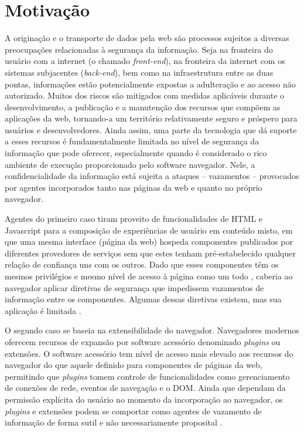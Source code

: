\section{Motivação}


A originação e o transporte de dados pela web são processos sujeitos a diversas preocupações relacionadas à segurança da informação. Seja na fronteira do usuário com a internet (o chamado \textit{front-end}), na fronteira da internet com os sistemas subjacentes (\textit{back-end}), bem como na infraestrutura entre as duas pontas, informações estão potencialmente expostas a adulteração e ao acesso não autorizado. Muitos dos riscos são mitigados com medidas aplicáveis durante o desenvolvimento, a publicação e a manutenção dos recursos que compõem as aplicações da web, tornando-a um território relativamente seguro e próspero para usuários e desenvolvedores. Ainda assim, uma parte da tecnologia que dá suporte a esses recursos é fundamentalmente limitada no nível de segurança da informação que pode oferecer, especialmente quando é considerado o rico ambiente de execução proporcionado pelo software navegador. Nele, a confidencialidade da informação está sujeita a ataques -- vazamentos -- provocados por agentes incorporados tanto nas páginas da web e quanto no próprio navegador.

Agentes do primeiro caso tiram proveito de funcionalidades de HTML e Javascript para a composição de experiências de usuário em conteúdo misto, em que uma mesma interface (página da web) hospeda componentes publicados por diferentes provedores de serviços sem que estes tenham pré-estabelecido qualquer relação de confiança uns com os outros. Dado que esses componentes têm os mesmos privilégios e mesmo nível de acesso à página como um todo \cite[p. 2-3]{DeRyck2012}, caberia ao navegador aplicar diretivas de segurança que impedissem vazamentos de informação entre os componentes. Algumas dessas diretivas existem, mas sua aplicação é limitada \cite{Jang2010}.

O segundo caso se baseia na extensibilidade do navegador. Navegadores modernos oferecem recursos de expansão por software acessório denominado \textit{plugins} ou extensões. O software acessório tem nível de acesso mais elevado aos recursos do navegador do que aquele definido para componentes de páginas da web, permitindo que \textit{plugins} tomem controle de funcionalidades como gerenciamento de conexões de rede, eventos de navegação e o DOM. Ainda que dependam da permissão explícita do usuário no momento da incorporação ao navegador, os \textit{plugins} e extensões podem se comportar como agentes de vazamento de informação de forma sutil e não necessariamente proposital \cite{Heule2015}.


